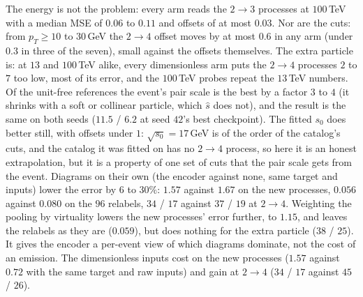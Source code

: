\documentclass[11pt]{article}
\begin{document}
The energy is not the problem: every arm reads the $2\to3$ processes at $100$\,TeV with a median MSE of $0.06$ to $0.11$ and offsets of
at most $0.03$. Nor are the cuts: from $p_T\geq10$ to $30$\,GeV the $2\to4$ offset moves by
at most $0.6$ in any arm (under $0.3$ in three of the seven), small against the offsets themselves. The extra particle is: at $13$ and
$100$\,TeV alike, every dimensionless arm puts the $2\to4$ processes $2$ to $7$ too low, most of its
error, and the $100$\,TeV probes repeat the $13$\,TeV numbers. Of the unit-free references the event's pair scale is the
best by a factor $3$ to $4$ (it shrinks with a soft or collinear particle, which $\hat s$ does not), and the result is the
same on both seeds ($11.5$ / $6.2$ at seed $42$'s best checkpoint). The fitted $s_0$ does better still, with offsets under
$1$: $\sqrt{s_0}=17$\,GeV is of the order of the catalog's cuts, and the catalog it was fitted on has no $2\to4$ process, so
here it is an honest extrapolation, but it is a property of one set of cuts that the pair scale gets from the event. Diagrams on
their own (the encoder against none, same target and inputs) lower the error by $6$ to $30\%$: $1.57$ against $1.67$ on
the new processes, $0.056$ against $0.080$ on the $96$ relabels, $34$ / $17$ against $37$ / $19$ at $2\to4$. Weighting the pooling
by virtuality lowers the new processes' error further, to $1.15$, and leaves the relabels as they are ($0.059$), but does
nothing for the extra particle ($38$ / $25$). It gives the encoder a per-event view of which diagrams dominate, not the
cost of an emission. The dimensionless inputs cost on the new processes ($1.57$ against $0.72$ with the same target and raw
inputs) and gain at $2\to4$ ($34$ / $17$ against $45$ / $26$).
\end{document}
